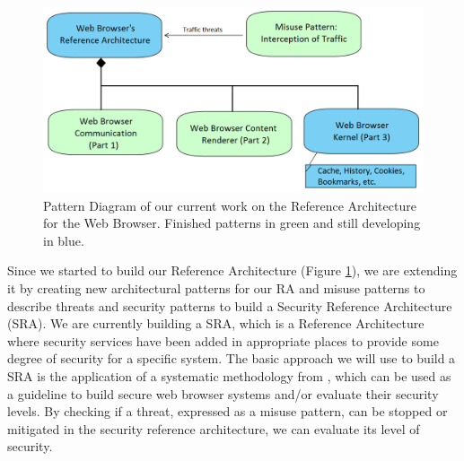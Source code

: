 \documentclass[]{acmlarge}
\begin{document}
    \begin{figure}[h!t]
      \vspace*{-0.4cm}
      \centering
      \hspace{0.5cm}\includegraphics[scale=0.45]{figures/relations-finish.png}
      \caption{Pattern Diagram of our current work on the Reference Architecture for the Web Browser. Finished patterns in green and still developing in blue.}
      \label{fig:relations}
    \end{figure}


Since we started to build our Reference Architecture (Figure \ref{fig:relations}), we are extending it by creating new architectural patterns for our RA and misuse patterns to describe threats and security patterns to build a Security Reference Architecture (SRA). We are currently building a SRA, which is a Reference Architecture where security services have been added in appropriate places to provide some degree of security for a specific system. The basic approach we will use to build a SRA is the application of a systematic methodology from \cite{fernandez2006methodology,Fernandez2011,Fernandez2016}, which can be used as a guideline to build secure web browser systems and/or evaluate their security levels. By checking if a threat, expressed as a misuse pattern, can be stopped or mitigated in the security reference architecture, we can evaluate its level of security.

\end{document}
